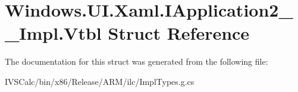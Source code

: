 \hypertarget{struct_windows_1_1_u_i_1_1_xaml_1_1_i_application2_____impl_1_1_vtbl}{}\section{Windows.\+U\+I.\+Xaml.\+I\+Application2\+\_\+\+\_\+\+Impl.\+Vtbl Struct Reference}
\label{struct_windows_1_1_u_i_1_1_xaml_1_1_i_application2_____impl_1_1_vtbl}


The documentation for this struct was generated from the following file\+:\begin{DoxyCompactItemize}
\item 
I\+V\+S\+Calc/bin/x86/\+Release/\+A\+R\+M/ilc/Impl\+Types.\+g.\+cs\end{DoxyCompactItemize}
